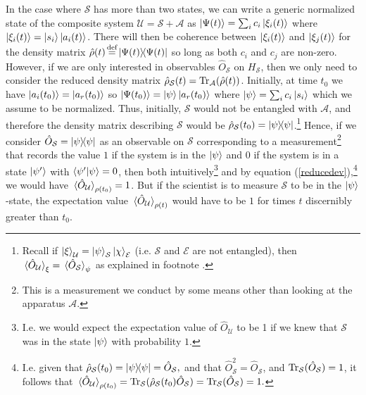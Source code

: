     In the case where $\mathcal{S}$ has more than two states, we can write a generic normalized state of the composite system $\mathcal{U}=\mathcal{S}+\mathcal{A}$  as $\ket{\Psi(t)}=\sum_i c_i\ket{\xi_i(t)}$  where $\ket{\xi_i(t)}=\ket{s_i}\ket{a_i(t)}$. There will then be coherence between $\ket{\xi_i(t)}$ and $\ket{\xi_j(t)}$ for the density matrix $\hat{\rho}(t)\myeq\dyad{\Psi(t)}$ so long as both $c_i$ and $c_j$ are non-zero. However, if we are only interested in observables $\hat{O}_\mathcal{S}$ on $H_\mathcal{S}$, then we only need to consider the reduced density matrix $\hat{\rho}_\mathcal{S}(t)=\operatorname{Tr}_\mathcal{A}(\hat{\rho}(t))$. Initially, at time $t_0$ we have $\ket{a_i(t_0)}=\ket{a_r(t_0)}$ so $\ket{\Psi(t_0)}=\ket{\psi}\ket{a_r(t_0)}$ where $\ket{\psi}=\sum_i c_i\ket{s_i}$ which we assume to be normalized. Thus, initially, $\mathcal{S}$ would not be entangled with $\mathcal{A}$, and therefore the density matrix describing $\mathcal{S}$ would be $\hat{\rho}_\mathcal{S}(t_0)=\dyad{\psi}$.\footnote{Recall if $\ket{\xi}_\mathcal{U}=\ket{\psi}_\mathcal{S}\ket{\chi}_\mathcal{E}$ (i.e. $\mathcal{S}$ and $\mathcal{E}$ are not entangled), then $\ev*{\hat{O}_\mathcal{U}}_\xi=\ev*{\hat{O}_\mathcal{S}}_\psi$ as explained in footnote .} Hence, if we consider $\hat{O}_\mathcal{S}=\dyad{\psi}$ as an observable on $\mathcal{S}$ corresponding to a measurement\footnote{This is a measurement we conduct by some means other than looking at the apparatus $\mathcal{A}$.} that records the value $1$ if the system is in the $\ket{\psi}$ and $0$ if the system is in a state $\ket{\psi'}$ with $\ip{\psi'}{\psi}=0$, then both intuitively\footnote{I.e. we would expect the expectation value of $\hat{O}_\mathcal{U}$ to be 1 if we knew that $\mathcal{S}$ was in the state $\ket{\psi}$ with probability $1$. } and by equation (\ref{reducedev}),\footnote{I.e. given that $\hat{\rho}_\mathcal{S}(t_0)=\dyad{\psi}=\hat{O}_\mathcal{S},$ and that $\hat{O}_\mathcal{S}^2= \hat{O}_\mathcal{S}$, and $\operatorname{Tr}_\mathcal{S}(\hat{O}_\mathcal{S}) =1$, it follows that $\ev*{\hat{O}_\mathcal{U}}_{\rho(t_0)}=\Tr_\mathcal{S}(\hat{\rho}_\mathcal{S}(t_0)\hat{O}_\mathcal{S})= \Tr_\mathcal{S}(\hat{O}_\mathcal{S})=1.$} we would have $\ev*{\hat{O}_\mathcal{U}}_{\rho(t_0)}=1$. But if the scientist is to measure $\mathcal{S}$ to be in the $\ket{\psi}$-state, the expectation value $\ev*{\hat{O}_\mathcal{U}}_{\rho(t)}$ would have to be $1$ for times $t$ discernibly greater than $t_0$. 
    
